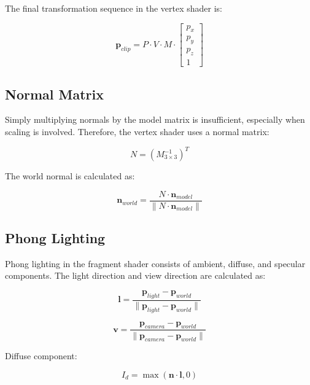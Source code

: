 \documentclass[12pt,a4paper]{article}
\begin{document}
The final transformation sequence in the vertex shader is:

\begin{equation}
    \mathbf{p}_{clip} = P \cdot V \cdot M \cdot
    \begin{bmatrix}
        p_x \\ p_y \\ p_z \\ 1
    \end{bmatrix}
\end{equation}

\subsection{Normal Matrix}

Simply multiplying normals by the model matrix is insufficient, especially
when scaling is involved. Therefore, the vertex shader uses a normal matrix:

\begin{equation}
    N = \left(M_{3 \times 3}^{-1}\right)^T
\end{equation}

The world normal is calculated as:

\begin{equation}
    \mathbf{n}_{world} =
    \frac{N \cdot \mathbf{n}_{model}}
    {\|N \cdot \mathbf{n}_{model}\|}
\end{equation}

\subsection{Phong Lighting}

Phong lighting in the fragment shader consists of ambient, diffuse, and
specular components. The light direction and view direction are calculated as:

\begin{equation}
    \mathbf{l} =
    \frac{\mathbf{p}_{light} - \mathbf{p}_{world}}
    {\|\mathbf{p}_{light} - \mathbf{p}_{world}\|}
\end{equation}

\begin{equation}
    \mathbf{v} =
    \frac{\mathbf{p}_{camera} - \mathbf{p}_{world}}
    {\|\mathbf{p}_{camera} - \mathbf{p}_{world}\|}
\end{equation}

Diffuse component:

\begin{equation}
    I_d = \max(\mathbf{n} \cdot \mathbf{l}, 0)
\end{equation}
\end{document}
